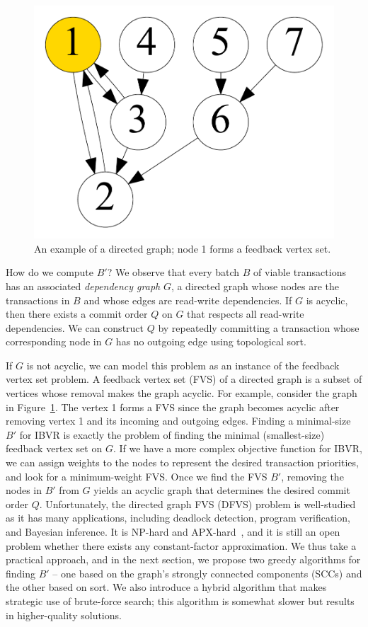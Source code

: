 \begin{figure}[t]
	\centering
	\includegraphics[width=0.3\columnwidth]{./alg_fig/fvs-eg}
	\vspace{-1em}
	\caption{An example of a directed graph; node 1 forms a feedback vertex set.}
	\vspace{-1em}
	\label{fig:fvs}
\end{figure}

How do we compute $B'$? We observe that every batch $B$ of viable transactions 
has an associated \emph{dependency graph} $G$, a directed graph whose nodes are the transactions in $B$ and whose edges are read-write dependencies.
If $G$ is acyclic, then there exists a commit order $Q$ on $G$ that respects all read-write dependencies. We can construct $Q$ by repeatedly committing a transaction whose corresponding node in $G$ has no outgoing edge using topological sort. 

If $G$ is not acyclic, we can model this problem as an instance of the feedback vertex set problem. 
A feedback vertex set (FVS) of a directed graph is a subset of vertices whose removal makes the graph acyclic. For example, consider the graph in Figure~\ref{fig:fvs}. The vertex 1 forms a FVS since the graph becomes acyclic after removing vertex 1 and its incoming and outgoing edges. Finding a minimal-size $B'$ for IBVR is exactly the problem of finding the minimal (smallest-size) feedback vertex set on $G$. If we have a more complex objective function for IBVR, we can assign weights to the nodes to represent the desired transaction priorities, and look for a minimum-weight FVS. 
Once we find the FVS $B'$, removing the nodes in $B'$ from $G$ yields an acyclic graph that determines the desired commit order $Q$.
Unfortunately, the directed graph FVS (DFVS) problem is well-studied as it has many applications, including deadlock detection, program verification, and Bayesian inference. It is NP-hard and APX-hard~\cite{kann1992approximability, karp1972reducibility}, and it is still an open problem whether there exists any constant-factor approximation.
We thus take a practical approach, and in the next section, we propose two greedy algorithms for finding $B'$ -- one based
on the graph's strongly connected components (SCCs) and the other based on sort.
We also introduce a hybrid algorithm that makes strategic use of brute-force search; this algorithm is somewhat slower but results in higher-quality solutions.


